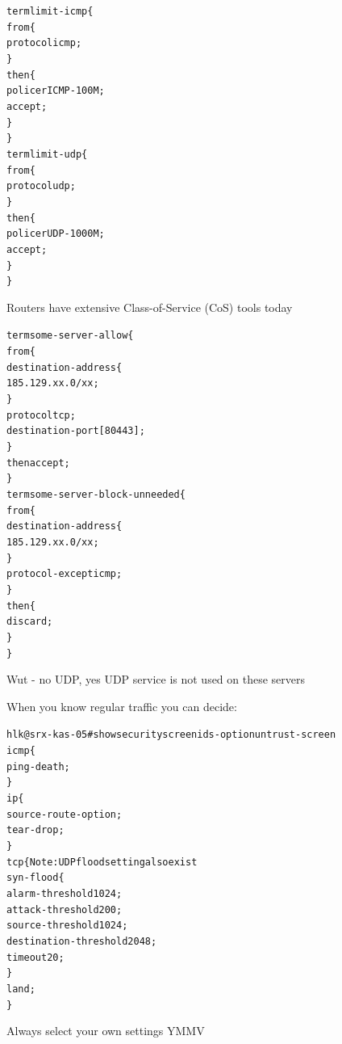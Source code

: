 \documentclass[20pt,landscape,a4paper,footrule]{foils}
\begin{document}
\begin{alltt}\footnotesize
term limit-icmp \{
    from \{
        protocol icmp;
    \}
    then \{
        policer ICMP-100M;
        accept;
    \}
\}
term limit-udp \{
    from \{
        protocol udp;
    \}
    then \{
        policer UDP-1000M;
        accept;
    \}
\}
\end{alltt}

Routers have extensive Class-of-Service (CoS) tools today


\begin{alltt}\footnotesize
term some-server-allow \{
    from \{
        destination-address \{
            185.129.xx.0/xx;
        \}
        protocol tcp;
        destination-port [ 80 443 ];
    \}
    then accept;
\}
term some-server-block-unneeded \{
    from \{
        destination-address \{
            185.129.xx.0/xx;
        \}
        protocol-except icmp;
    \}
    then \{
        discard;
    \}
\}
\end{alltt}

Wut - no UDP, yes UDP service is not used on these servers



When you know regular traffic you can decide:

\begin{alltt}\footnotesize
hlk@srx-kas-05# show security screen ids-option untrust-screen
icmp \{
    ping-death;
\}
ip \{
    source-route-option;
    tear-drop;
\}
tcp \{    Note: UDP flood setting also exist
    syn-flood \{
        alarm-threshold 1024;
        attack-threshold 200;
        source-threshold 1024;
        destination-threshold 2048;
        timeout 20;
    \}
    land;
\}
\end{alltt}

Always select your own settings YMMV
\end{document}
